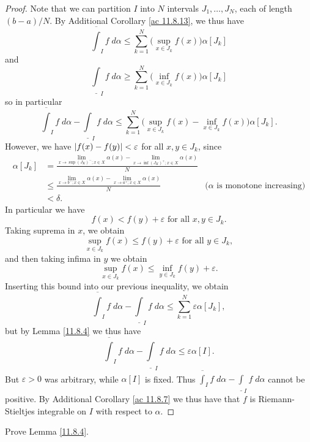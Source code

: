 \begin{proof}
    Note that we can partition \(I\) into \(N\) intervals \(J_1, \dots, J_N\), each of length \((b - a) / N\).
    By Additional Corollary \ref{ac 11.8.13}, we thus have
    \[
        \overline{\int}_I f \; d \alpha \leq \sum_{k = 1}^N \big(\sup_{x \in J_k} f(x)\big) \alpha[J_k]
    \]
    and
    \[
        \underline{\int}_I f \; d \alpha \geq \sum_{k = 1}^N \big(\inf_{x \in J_k} f(x)\big) \alpha[J_k]
    \]
    so in particular
    \[
        \overline{\int}_I f \; d \alpha - \underline{\int}_I f \; d \alpha \leq \sum_{k = 1}^N \big(\sup_{x \in J_k} f(x) - \inf_{x \in J_k} f(x)\big) \alpha[J_k].
    \]
    However, we have \(\abs*{f(x) - f(y)} < \varepsilon\) for all \(x, y \in J_k\), since
    \begin{align*}
        \alpha[J_k] & = \frac{\lim_{x \to \sup(J_K)^- ; x \in X} \alpha(x) - \lim_{x \to \inf(J_K)^+ ; x \in X} \alpha(x)}{N}                                              \\
                    & \leq \frac{\lim_{x \to b^- ; x \in X} \alpha(x) - \lim_{x \to a^+ ; x \in X} \alpha(x)}{N}              & \text{(\(\alpha\) is monotone increasing)} \\
                    & < \delta.
    \end{align*}
    In particular we have
    \[
        f(x) < f(y) + \varepsilon \text{ for all } x, y \in J_k.
    \]
    Taking suprema in \(x\), we obtain
    \[
        \sup_{x \in J_k} f(x) \leq f(y) + \varepsilon \text{ for all } y \in J_k,
    \]
    and then taking infima in \(y\) we obtain
    \[
        \sup_{x \in J_k} f(x) \leq \inf_{y \in J_k} f(y) + \varepsilon.
    \]
    Inserting this bound into our previous inequality, we obtain
    \[
        \overline{\int}_I f \; d \alpha - \underline{\int}_I f \; d \alpha \leq \sum_{k = 1}^N \varepsilon \alpha[J_k],
    \]
    but by Lemma \ref{11.8.4} we thus have
    \[
        \overline{\int}_I f \; d \alpha - \underline{\int}_I f \; d \alpha \leq \varepsilon \alpha[I].
    \]
    But \(\varepsilon > 0\) was arbitrary, while \(\alpha[I]\) is fixed.
    Thus \(\overline{\int}_I f \; d \alpha - \underline{\int}_I f \; d \alpha\) cannot be positive.
    By Additional Corollary \ref{ac 11.8.7} we thus have that \(f\) is Riemann-Stieltjes integrable on \(I\) with respect to \(\alpha\).
\end{proof}

\exercisesection

\begin{exercise}\label{ex 11.8.1}
    Prove Lemma \ref{11.8.4}.
\end{exercise}

